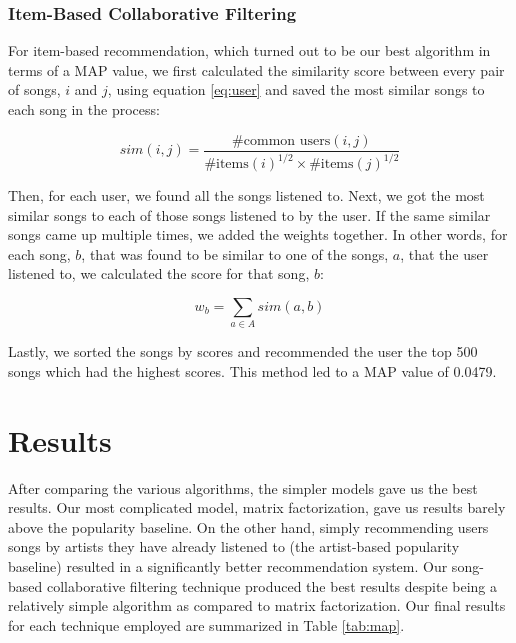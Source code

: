 \documentclass[11pt,preprint]{aastex}
\begin{document}
\subsubsection{Item-Based Collaborative Filtering}
For item-based recommendation, which turned out to be our best algorithm in terms of a MAP value, we first calculated the similarity score between every pair of songs, $i$ and $j$, using equation \ref{eq:user} and saved the most similar songs to each song in the process:

\begin{equation}
sim(i,j) = \frac{\text{\# common users}(i, j)}{{\text{\# items}(i)}^{1/2} \times {\text{\# items}(j)}^{1/2}}
\label{eq:user}
\end{equation}

Then, for each user, we found all the songs listened to. Next, we got the most similar songs to each of those songs listened to by the user. If the same similar songs came up multiple times, we added the weights together. In other words, for each song, $b$, that was found to be similar to one of the songs, $a$, that the user listened to, we calculated the score for that song, $b$:

$$w_b = \sum_{a \in A} sim(a, b)$$

Lastly, we sorted the songs by scores and recommended the user the top 500 songs which had the highest scores. This method led to a MAP value of 0.0479.





\section{Results}
After comparing the various algorithms, the simpler models gave us the best results. Our most complicated model, matrix factorization, gave us results barely above the popularity baseline. On the other hand, simply recommending users songs by artists they have already listened to (the artist-based popularity baseline) resulted in a significantly better recommendation system. Our song-based collaborative filtering technique produced the best results despite being a relatively simple algorithm as compared to matrix factorization. Our final results for each technique employed are summarized in Table \ref{tab:map}. 
\end{document}
